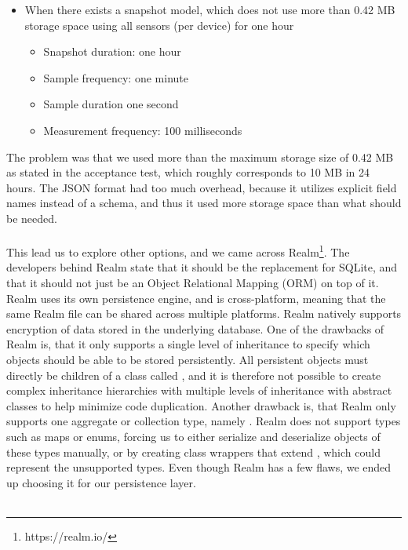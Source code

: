 \begin{itemize}[noitemsep]
   \item When there exists a snapshot model, which does not use more than 0.42 MB storage space using all sensors (per device) for one hour
   \begin{itemize}[noitemsep,topsep=0pt,parsep=0pt,partopsep=0pt]
      \item Snapshot duration: one hour
      \item Sample frequency: one minute
      \item Sample duration one second
      \item Measurement frequency: 100 milliseconds
   \end{itemize}
\end{itemize}

The problem was that we used more than the maximum storage size of 0.42 MB as stated in the acceptance test, which roughly corresponds to 10 MB in 24 hours. The JSON format had too much overhead, because it utilizes explicit field names instead of a schema, and thus it used more storage space than what should be needed. 
\\\\
This lead us to explore other options, and we came across Realm\footnote{https://realm.io/}. The developers behind Realm state that it should be the replacement for SQLite, and that it should not just be an Object Relational Mapping (ORM) on top of it. Realm uses its own persistence engine, and is cross-platform, meaning that the same Realm file can be shared across multiple platforms. Realm natively supports encryption of data stored in the underlying database. One of the drawbacks of Realm is, that it only supports a single level of inheritance to specify which objects should be able to be stored persistently. All persistent objects must directly be children of a class called , and it is therefore not possible to create complex inheritance hierarchies with multiple levels of inheritance with abstract classes to help minimize code duplication. Another drawback is, that Realm only supports one aggregate or collection type, namely . Realm does not support types such as maps or enums, forcing us to either serialize and deserialize objects of these types manually, or by creating class wrappers that extend , which could represent the unsupported types. Even though Realm has a few flaws, we ended up choosing it for our persistence layer.
\\\\
